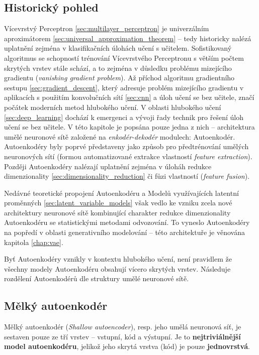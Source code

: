 \subsection{Historický pohled}
Vícevrstvý Perceptron \autoref{sec:multilayer_perceptron} je univerzálním aproximátorem \autoref{sec:universal_approximation_theorem} – tedy historicky nalézá uplatnění zejména v klasifikačních úlohách učení s učitelem.
Sofistikovaný algoritmus se schopností trénování Vícevrstvého Perceptronu s větším počtem skrytých vrstev stále schází, a to zejména v důsledku problému mizejícího gradientu (\emph{vanishing gradient problem}).
Až příchod algoritmu gradientního sestupu \autoref{sec:gradient_descent}, který adresuje problém mizejícího gradientu v aplikacích s použitím konvolučních sítí \autoref{sec:cnn} a úloh učení se bez učitele, značí počátek moderních metod hlubokého učení.
V oblasti hlubokého učení \autoref{sec:deep_learning} dochází k emergenci a vývoji řady technik pro řešení úloh učení se bez učitele.
V této kapitole je popsána pouze jedna z nich – architektura umělé neuronové sítě založené na \emph{enkodér-dekodér} modulech: Autoenkodér.
Autoenkodéry byly poprvé představeny jako způsob pro předtrénování umělých neuronových sítí (formou automatizované extrakce vlastností \emph{feature extraction}). 
Později Autoenkodéry nalézají uplatnění zejména v úloháh redukce dimenzionality \autoref{sec:dimensionality_reduction} či fůzi vlastností (\emph{feature fusion}).


Nedávné teoretické propojení Autoenkodéru a Modelů využívajících latentní proměnných \autoref{sec:latent_variable_models} však vedlo ke vzniku zcela nové architektury neuronové sítě kombinující charakter redukce dimenzionality Autoenkodéru se statistickými metodami odvozování.
To vyneslo Autoenkodéry na popředí v oblasti generativního modelování – této architektuře je věnována kapitola \autoref{chap:vae}.

Byť Autoenkodéry vznikly v kontextu hlubokého učení, není pravidlem že všechny modely Autoenkodéru obsahují vícero skrytých vrstev. Následuje rozdělení Autoenkodérů dle struktury umělé neuronové sítě.

\subsection{Mělký autoenkodér}
Mělký autoenkodér (\emph{Shallow autoencoder}), resp. jeho umělá neuronová síť, je sestaven pouze ze tří vrstev – vstupní, kód a výstupní.
Je to \textbf{nejtriviálnější model autoenkodéru}, jelikož jeho skrytá vrstva (kód) je pouze \textbf{jednovrstvá}.
\label{sec:shallow_autoncoder}
